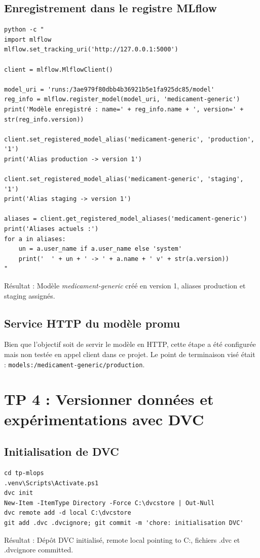 \documentclass[12pt,a4paper]{report}
\begin{document}
\section{Enregistrement dans le registre MLflow}
\begin{verbatim}
python -c "
import mlflow
mlflow.set_tracking_uri('http://127.0.0.1:5000')

client = mlflow.MlflowClient()

model_uri = 'runs:/3ae979f80dbb4b36921b5e1fa925dc85/model'
reg_info = mlflow.register_model(model_uri, 'medicament-generic')
print('Modèle enregistré : name=' + reg_info.name + ', version=' + str(reg_info.version))

client.set_registered_model_alias('medicament-generic', 'production', '1')
print('Alias production -> version 1')

client.set_registered_model_alias('medicament-generic', 'staging', '1')
print('Alias staging -> version 1')

aliases = client.get_registered_model_aliases('medicament-generic')
print('Aliases actuels :')
for a in aliases:
    un = a.user_name if a.user_name else 'system'
    print('  ' + un + ' -> ' + a.name + ' v' + str(a.version))
"
\end{verbatim}
Résultat : Modèle \textit{medicament-generic} créé en version 1, aliases production et staging assignés.

\section{Service HTTP du modèle promu}
Bien que l'objectif soit de servir le modèle en HTTP, cette étape a été configurée mais non testée en appel client dans ce projet. Le point de terminaison visé était : \texttt{models:/medicament-generic/production}.

\chapter{TP 4 : Versionner données et expérimentations avec DVC}

\section{Initialisation de DVC}
\begin{verbatim}
cd tp-mlops
.venv\Scripts\Activate.ps1
dvc init
New-Item -ItemType Directory -Force C:\dvcstore | Out-Null
dvc remote add -d local C:\dvcstore
git add .dvc .dvcignore; git commit -m 'chore: initialisation DVC'
\end{verbatim}
Résultat : Dépôt DVC initialisé, remote local pointing to C:\dvcstore, fichiers .dvc et .dvcignore committed.
\end{document}
